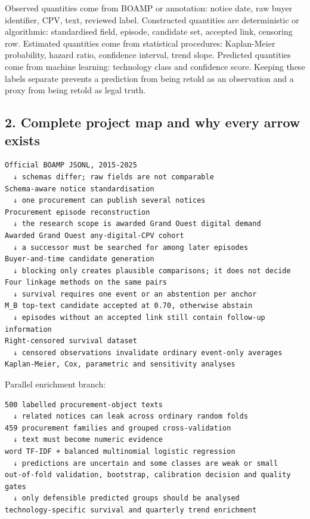 Observed quantities come from BOAMP or annotation: notice date, raw
buyer identifier, CPV, text, reviewed label. Constructed quantities are
deterministic or algorithmic: standardised field, episode, candidate
set, accepted link, censoring row. Estimated quantities come from
statistical procedures: Kaplan-Meier probability, hazard ratio,
confidence interval, trend slope. Predicted quantities come from machine
learning: technology class and confidence score. Keeping these labels
separate prevents a prediction from being retold as an observation and a
proxy from being retold as legal truth.

\subsection{2. Complete project map and why every arrow
exists}\label{2-complete-project-map-and-why-every-arrow-exists}

\begin{verbatim}
Official BOAMP JSONL, 2015-2025
  ↓ schemas differ; raw fields are not comparable
Schema-aware notice standardisation
  ↓ one procurement can publish several notices
Procurement episode reconstruction
  ↓ the research scope is awarded Grand Ouest digital demand
Awarded Grand Ouest any-digital-CPV cohort
  ↓ a successor must be searched for among later episodes
Buyer-and-time candidate generation
  ↓ blocking only creates plausible comparisons; it does not decide
Four linkage methods on the same pairs
  ↓ survival requires one event or an abstention per anchor
M_B top-text candidate accepted at 0.70, otherwise abstain
  ↓ episodes without an accepted link still contain follow-up information
Right-censored survival dataset
  ↓ censored observations invalidate ordinary event-only averages
Kaplan-Meier, Cox, parametric and sensitivity analyses
\end{verbatim}

Parallel enrichment branch:

\begin{verbatim}
500 labelled procurement-object texts
  ↓ related notices can leak across ordinary random folds
459 procurement families and grouped cross-validation
  ↓ text must become numeric evidence
word TF-IDF + balanced multinomial logistic regression
  ↓ predictions are uncertain and some classes are weak or small
out-of-fold validation, bootstrap, calibration decision and quality gates
  ↓ only defensible predicted groups should be analysed
technology-specific survival and quarterly trend enrichment
\end{verbatim}

